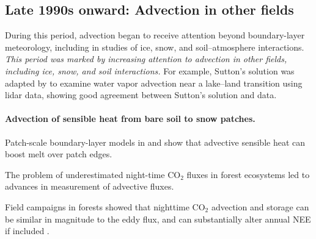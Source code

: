 \documentclass{article}
\begin{document}

    \subsection{Late 1990s onward: Advection in other fields }

    During this period, advection began to receive attention beyond boundary-layer meteorology, including in studies of ice, snow, and soil–atmosphere interactions.
    \textit{This period was marked by increasing attention to advection in other fields, including ice, snow, and soil interactions. }
    For example, Sutton's solution  was  adapted by  \citet{higgins2013measured} to examine water vapor advection near a lake–land transition using lidar data, showing good agreement between Sutton's solution and data.   

    \paragraph{Advection of sensible heat from bare soil to snow patches.}
    Patch-scale boundary-layer models in \citet{shook_snowmelt_1997} and \citet{essery_boundarylayer_2006} show that advective sensible heat can boost melt over patch edges.


    \citet{harder_simple_2019}

    

    The problem of underestimated night-time CO$_2$ fluxes in forest ecosystems led to advances in measurement of advective fluxes.

     Field campaigns in forests showed that nighttime CO$_2$ advection and storage can be similar in magnitude to the eddy flux, and can substantially alter annual NEE if included \cite{aubinet2003horizontal, marcolla2005importance, yi2008contribution, feigenwinter2008comparison, etzold2010contribution}. 
\end{document}
